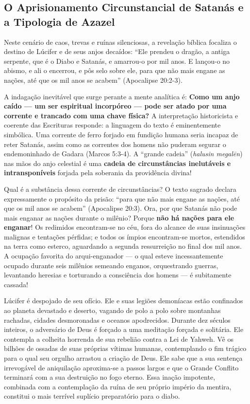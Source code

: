 \subsection{O Aprisionamento Circunstancial de Satanás e a Tipologia de Azazel}


Neste cenário de caos, trevas e ruínas silenciosas, a revelação bíblica focaliza o destino de Lúcifer e de seus anjos decaídos:
``Ele prendeu o dragão, a antiga serpente, que é o Diabo e Satanás, e amarrou-o por mil anos. E lançou-o no abismo, e ali o encerrou, e pôs selo sobre ele, para que não mais engane as nações, até que os mil anos se acabem'' (Apocalipse 20:2-3).

A indagação inevitável que surge perante a mente analítica é: \textbf{Como um anjo caído — um ser espiritual incorpóreo — pode ser atado por uma corrente e trancado com uma chave física?}
A interpretação historicista e coerente das Escrituras responde: a linguagem do texto é eminentemente simbólica. Uma corrente de ferro forjado em fundição humana seria incapaz de reter Satanás, assim como as correntes dos homens não puderam segurar o endemoninhado de Gadara (Marcos 5:3-4). A ``grande cadeia'' (\textit{halusin megalēn}) nas mãos do anjo celestial é uma \textbf{cadeia de circunstâncias inelutáveis e intransponíveis} forjada pela soberania da providência divina!

Qual é a substância dessa corrente de circunstâncias?
O texto sagrado declara expressamente o propósito da prisão: ``para que não mais engane as nações, até que os mil anos se acabem'' (Apocalipse 20:3).
Ora, por que Satanás não pode mais enganar as nações durante o milênio?
Porque \textbf{não há nações para ele enganar}!
Os redimidos encontram-se no céu, fora do alcance de suas insinuações malignas e tentações pérfidas; e todos os ímpios encontram-se mortos, estendidos na terra como esterco, aguardando a segunda ressurreição no final dos mil anos. A ocupação favorita do arqui-enganador — o qual esteve incessantemente ocupado durante seis milênios semeando enganos, orquestrando guerras, levantando heresias e torturando a consciência dos homens — é subitamente cassada!

Lúcifer é despojado de seu ofício. Ele e suas legiões demoníacas estão confinados ao planeta devastado e deserto, vagando de polo a polo sobre montanhas rachadas, cidades desmoronadas e oceanos apodrecidos. Durante dez séculos inteiros, o adversário de Deus é forçado a uma meditação forçada e solitária. Ele contempla a colheita horrenda de sua rebelião contra a Lei de Yahweh. Vê os bilhões de ossadas de suas próprias vítimas humanas, contemplando o fim trágico para o qual seu orgulho arrastou a criação de Deus. Ele sabe que a sua sentença irrevogável de aniquilação aproxima-se a passos largos e que o Grande Conflito terminará com a sua destruição no fogo eterno. Essa inação impotente, combinada com a contemplação da ruína de seu próprio império da mentira, constitui o mais terrível suplício preparatório para o diabo.

